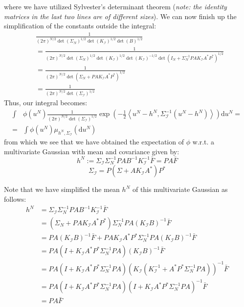 where we have utilized Sylvester's determinant theorem (\textit{note: the identity matrices in the last two lines are of different sizes}). We can now finish up the simplification of the constants outside the integral:
\begin{align*}
    &\frac{1}{(2\pi)^{N/2}\det(\Sigma_N)^{1/2}\det(K_\mathcal{I})^{1/2}\det(B)^{1/2}} \\
    &=\frac{1}{(2\pi)^{N/2}\det(\Sigma_N)^{1/2}\det(K_\mathcal{I})^{1/2}\det(K_{\mathcal{I}})^{-1/2}\det(I_{N}+\Sigma_{N}^{-1}PAK_{\mathcal{I}}A^{*}P^{*})^{1/2}} \\
    &= \frac{1}{(2\pi)^{N/2}\det(\Sigma_{N} + PAK_{\mathcal{I}}A^{*}P^{*})^{1/2}} \\
    &=\frac{1}{(2\pi)^{N/2}\det(\Sigma_{\mathcal{I}})^{1/2}}
\end{align*}
Thus, our integral becomes:
\begin{align}
    \int&\phi(u^{N})\frac{1}{(2\pi)^{N/2}\det(\Sigma_{\mathcal{I}})^{1/2}}\exp\left(-\frac{1}{2}\left\langle u^{N}-h^{N}, \Sigma_{\mathcal{I}}^{-1}(u^{N}-h^{N}) \right\rangle\right)\mathrm{d}u^N = \nonumber \\
    =&\int\phi(u^{N})\mu_{h^{N},\Sigma_{\mathcal{I}}}(\mathrm{d}u^N)
\end{align}
from which we see that we have obtained the expectation of $\phi$ w.r.t. a multivariate Gaussian with mean and covariance given by:
\begin{equation}
    h^{N}:=\Sigma_{\mathcal{I}}\Sigma_{N}^{-1}PAB^{-1}K_{\mathcal{I}}^{-1}\bar{F}=PA\bar{F}
\end{equation}
\begin{equation}
    \Sigma_{\mathcal{I}}=P(\Sigma+AK_{\mathcal{I}}A^{*})P^{*}
\end{equation}

Note that we have simplified the mean $h^N$ of this multivariate Gaussian as follows:
\begin{align*}
    h^N &= \Sigma_{\mathcal{I}}\Sigma_{N}^{-1}PAB^{-1}K_{\mathcal{I}}^{-1}\bar{F} \\
    &=(\Sigma_N+PAK_{\mathcal{I}}A^{*}P^{*})\Sigma_{N}^{-1}PA(K_{\mathcal{I}}B)^{-1}\bar{F} \\
    &=PA(K_{\mathcal{I}}B)^{-1}\bar{F}+PAK_{\mathcal{I}}A^{*}P^{*}\Sigma_{N}^{-1}PA(K_{\mathcal{I}}B)^{-1}\bar{F} \\
    &=PA(I+K_{\mathcal{I}}A^{*}P^{*}\Sigma_{N}^{-1}PA)(K_{\mathcal{I}}B)^{-1}\bar{F} \\
    &=PA(I+K_{\mathcal{I}}A^{*}P^{*}\Sigma_{N}^{-1}PA)(K_{\mathcal{I}}(K_{\mathcal{I}}^{-1}+A^{*}P^{*}\Sigma_{N}^{-1}PA))^{-1}\bar{F}\\
    &=PA(I+K_{\mathcal{I}}A^{*}P^{*}\Sigma_{N}^{-1}PA)(I+K_{\mathcal{I}}A^{*}P^{*}\Sigma_{N}^{-1}PA)^{-1}\bar{F}\\
    &=PA\bar{F}
\end{align*}

